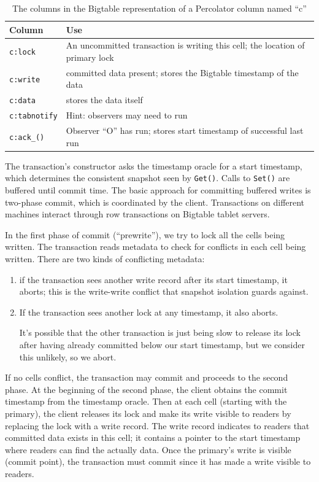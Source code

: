 \documentclass[11pt]{article}
\begin{document}
\begin{table}[htbp]
\caption{The columns in the Bigtable representation of a Percolator column named ``c''}
\centering
\begin{tabular}{l|l}
Column & Use\\
\hline
\texttt{c:lock} & An uncommitted transaction is writing this cell; the location of primary lock\\
\texttt{c:write} & committed data present; stores the Bigtable timestamp of the data\\
\texttt{c:data} & stores the data itself\\
\texttt{c:tabnotify} & Hint: observers may need to run\\
\texttt{c:ack\_()} & Observer ``O'' has run; stores start timestamp of successful last run\\
\end{tabular}
\end{table}

The transaction's constructor asks the timestamp oracle for a start timestamp, which determines the
consistent snapshot seen by \texttt{Get()}. Calls to \texttt{Set()} are buffered until commit time. The basic approach
for committing buffered writes is two-phase commit, which is coordinated by the client. Transactions
on different machines interact through row transactions on Bigtable tablet servers.

In the first phase of commit (``prewrite'')\label{Problem2}, we try to lock all the cells being written. The
transaction reads metadata to check for conflicts in each cell being written. There are two kinds of
conflicting metadata:
\begin{enumerate}
\item if the transaction sees another write record after its start timestamp, it aborts; this is the
write-write conflict that snapshot isolation guards against.
\item If the transaction sees another lock at any timestamp, it also aborts.

It’s possible that the other transaction is just being slow to release its lock after having
already committed below our start timestamp, but we consider this unlikely, so we abort.
\end{enumerate}

If no cells conflict, the transaction may commit and proceeds to the second phase. At the beginning of
the second phase, the client obtains the commit timestamp from the timestamp oracle. Then at each
cell (starting with the primary), the client releases its lock and make its write visible to readers
by replacing the lock with a write record. The write record indicates to readers that committed data
exists in this cell; it contains a pointer to the start timestamp where readers can find the actually
data.
Once the primary's write is visible (commit point), the transaction must commit since it has made a
write visible to readers.
\end{document}
